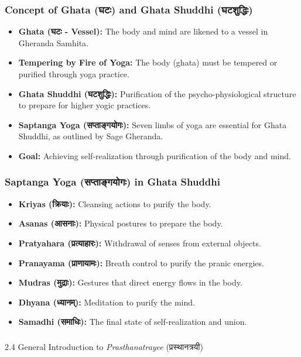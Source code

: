 \begin{frame}[fragile]\frametitle{Concept of Ghata (घटः) and Ghata Shuddhi (घटशुद्धिः)}
\begin{itemize}
    \item \textbf{Ghata (घटः - Vessel):} The body and mind are likened to a vessel in Gheranda Samhita.
    \item \textbf{Tempering by Fire of Yoga:} The body (ghata) must be tempered or purified through yoga practice.
    \item \textbf{Ghata Shuddhi (घटशुद्धिः):} Purification of the psycho-physiological structure to prepare for higher yogic practices.
    \item \textbf{Saptanga Yoga (सप्ताङ्गयोगः):} Seven limbs of yoga are essential for Ghata Shuddhi, as outlined by Sage Gheranda.
    \item \textbf{Goal:} Achieving self-realization through purification of the body and mind.
\end{itemize}
\end{frame}

\begin{frame}[fragile]\frametitle{Saptanga Yoga (सप्ताङ्गयोगः) in Ghata Shuddhi}
\begin{itemize}
    \item \textbf{Kriyas (क्रियाः):} Cleansing actions to purify the body.
    \item \textbf{Asanas (आसनाः):} Physical postures to prepare the body.
    \item \textbf{Pratyahara (प्रत्याहारः):} Withdrawal of senses from external objects.
    \item \textbf{Pranayama (प्राणायामः):} Breath control to purify the pranic energies.
    \item \textbf{Mudras (मुद्राः):} Gestures that direct energy flows in the body.
    \item \textbf{Dhyana (ध्यानम्):} Meditation to purify the mind.
    \item \textbf{Samadhi (समाधिः):} The final state of self-realization and union.
\end{itemize}
\end{frame}


\begin{frame}[fragile]\frametitle{}
\begin{center}
{\Large 2.4 General Introduction to \textit{Prasthanatrayee} (प्रस्थानत्रयी)}
\end{center}
\end{frame}


